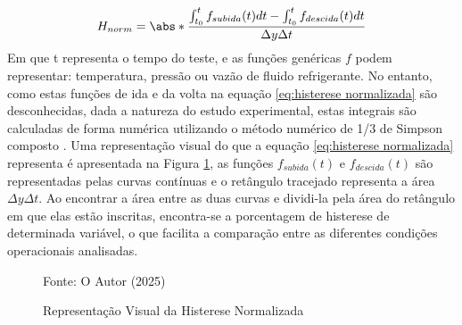 \begin{equation}
    H_{norm} = \abs*{{\frac{\int_{t_0} ^t  f_{subida}(t) dt - \int_{t_0} ^t  f_{descida}(t) dt   }{\Delta y\Delta t }}}
    \label{eq:histerese normalizada}
\end{equation}
\newpage
Em que t representa o tempo do teste, e as funções genéricas $f$ podem representar: temperatura, pressão ou vazão de fluido refrigerante. No entanto, como estas funções de ida e da volta na equação \ref{eq:histerese normalizada} são desconhecidas, dada a natureza do estudo experimental, estas integrais são calculadas de forma numérica utilizando o método numérico de 1/3 de Simpson composto \cite{ChapraNumerico}. Uma representação visual do que a equação \ref{eq:histerese normalizada} representa é apresentada na Figura \ref{fig:representação visual da histerese normalizada}, as funções $f_{subida}(t)$ e $f_{descida}(t)$ são representadas pelas curvas contínuas e o retângulo tracejado representa a área $\Delta y \Delta t$. Ao encontrar a área entre as duas curvas e dividi-la pela área do retângulo em que elas estão inscritas, encontra-se a porcentagem de histerese de determinada variável, o que facilita a comparação entre as diferentes condições operacionais analisadas.

\begin{figure}[h]
    \centering
    \caption{Representação Visual da Histerese Normalizada}
    \label{fig:representação visual da histerese normalizada}
    {\footnotesize Fonte: O Autor (2025)}
\end{figure}

